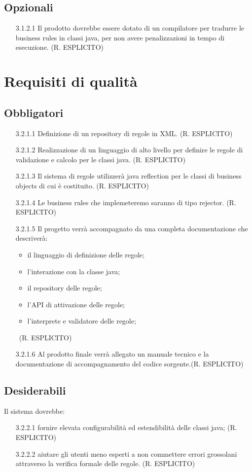 \documentclass[11pt,titlepage,a4paper]{report}
\begin{document}
\subsection{Opzionali}
\begin{itemize}
\item[3.1.2.1]Il prodotto dovrebbe essere dotato di un compilatore per tradurre le business rules in classi java, per non avere penalizzazioni in tempo di esecuzione. (R. ESPLICITO)
\end{itemize}
\section{Requisiti di qualit\`a}
\subsection{Obbligatori}
\begin{itemize}
\item[3.2.1.1]Definizione di un repository di regole in XML. (R. ESPLICITO)
\item[3.2.1.2]Realizzazione di un linguaggio di alto livello per definire le regole di validazione e calcolo per le classi java. (R. ESPLICITO)
\item[3.2.1.3]Il sistema di regole utilizzer\`a java reflection per le classi di business objects di cui \`e costituito. (R. ESPLICITO)
\item[3.2.1.4]Le business rules che implemeteremo saranno di tipo rejector. (R. ESPLICITO)
\item[3.2.1.5]Il progetto verr\`a accompagnato da una completa documentazione che descriver\`a:
\begin{itemize}
\item{}il linguaggio di definizione delle regole;
\item{}l'interazione con la classe java;
\item{}il repository delle regole;
\item{}l'API di attivazione delle regole;
\item{}l'interprete e validatore delle regole;
\end{itemize}\
(R. ESPLICITO)
\item[3.2.1.6]Al prodotto finale verr\`a allegato un manuale tecnico e la documentazione di accompagnamento del codice sorgente.(R. ESPLICITO)
\end{itemize}
\subsection{Desiderabili}
Il sistema dovrebbe: 
\begin{itemize}
\item[3.2.2.1]fornire elevata configurabilit\`a ed estendibilit\`a delle classi java; (R. ESPLICITO)
\item[3.2.2.2]aiutare gli utenti meno esperti a non commettere errori grossolani attraverso la verifica formale delle regole. (R. ESPLICITO)
\end{itemize}
\end{document}
